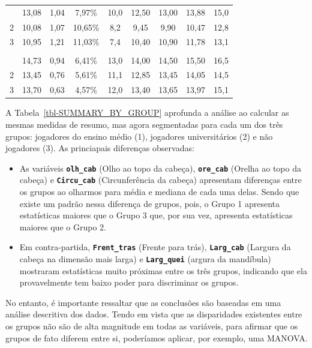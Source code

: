 \documentclass[
  portuguese,
  11pt,
]{article}
\begin{document}
\begin{table}
{\begin{tabular*}{\linewidth}{@{\extracolsep{\fill}}ccccccccc}
\midrule\addlinespace[2.5pt]
\multicolumn{9}{l}{olh\_cab} \\[2.5pt] 
\midrule\addlinespace[2.5pt]
1 & 13,08 & 1,04 & 7,97\% & 10,0 & 12,50 & 13,00 & 13,88 & 15,0 \\ 
2 & 10,08 & 1,07 & 10,65\% & 8,2 & 9,45 & 9,90 & 10,47 & 12,8 \\ 
3 & 10,95 & 1,21 & 11,03\% & 7,4 & 10,40 & 10,90 & 11,78 & 13,1 \\ 
\midrule\addlinespace[2.5pt]
\multicolumn{9}{l}{ore\_cab} \\[2.5pt] 
\midrule\addlinespace[2.5pt]
1 & 14,73 & 0,94 & 6,41\% & 13,0 & 14,00 & 14,50 & 15,50 & 16,5 \\ 
2 & 13,45 & 0,76 & 5,61\% & 11,1 & 12,85 & 13,45 & 14,05 & 14,5 \\ 
3 & 13,70 & 0,63 & 4,57\% & 12,0 & 13,40 & 13,65 & 13,97 & 15,1 \\ 
\bottomrule
\end{tabular*}

}

\end{table}%

A Tabela~\ref{tbl-SUMMARY_BY_GROUP} aprofunda a análise ao calcular as
mesmas medidas de resumo, mas agora segmentadas para cada um dos três
grupos: jogadores do ensino médio (1), jogadores universitários (2) e
não jogadores (3). As princiapais diferenças observadas:

\begin{itemize}
\item
  As variáveis \textbf{\texttt{olh\_cab}} (Olho ao topo da cabeça),
  \textbf{\texttt{ore\_cab}} (Orelha ao topo da cabeça) e
  \textbf{\texttt{Circu\_cab}} (Circunferência da cabeça) apresentam
  diferenças entre os grupos ao olharmos para média e mediana de cada
  uma delas. Sendo que existe um padrão nessa diferença de grupos, pois,
  o Grupo 1 apresenta estatísticas maiores que o Grupo 3 que, por sua
  vez, apresenta estatísticas maiores que o Grupo 2.
\item
  Em contra-partida, \textbf{\texttt{Frent\_tras}} (Frente para trás),
  \textbf{\texttt{Larg\_cab}} (Largura da cabeça na dimensão mais larga)
  e \textbf{\texttt{Larg\_quei}} (argura da mandíbula) mostraram
  estatísticas muito próximas entre os três grupos, indicando que ela
  provavelmente tem baixo poder para discriminar os grupos.
\end{itemize}

No entanto, é importante ressaltar que as conclusões são baseadas em uma
análise descritiva dos dados. Tendo em vista que as disparidades
existentes entre os grupos não são de alta magnitude em todas as
variáveis, para afirmar que os grupos de fato diferem entre si,
poderíamos aplicar, por exemplo, uma MANOVA.
\end{document}
